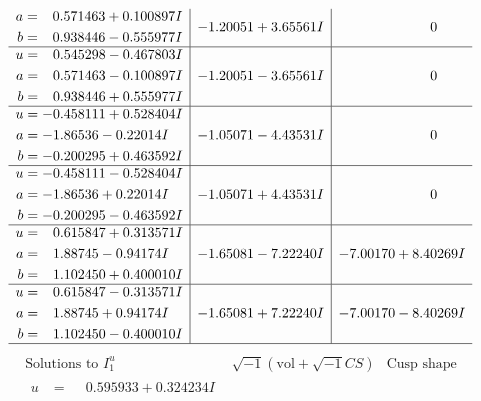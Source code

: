 \documentclass[1p]{elsarticle_modified}
\theoremstyle{definition}
\newcommand{\I}{\sqrt{-1}}
\begin{document}
$$\begin{array}{c|c|c}
\begin{aligned}
a &= \phantom{-}0.571463 + 0.100897 I \\
b &= \phantom{-}0.938446 - 0.555977 I\end{aligned}
 & -1.20051 + 3.65561 I & \phantom{-0.000000 } 0 \\ \hline\begin{aligned}
u &= \phantom{-}0.545298 - 0.467803 I \\
a &= \phantom{-}0.571463 - 0.100897 I \\
b &= \phantom{-}0.938446 + 0.555977 I\end{aligned}
 & -1.20051 - 3.65561 I & \phantom{-0.000000 } 0 \\ \hline\begin{aligned}
u &= -0.458111 + 0.528404 I \\
a &= -1.86536 - 0.22014 I \\
b &= -0.200295 + 0.463592 I\end{aligned}
 & -1.05071 - 4.43531 I & \phantom{-0.000000 } 0 \\ \hline\begin{aligned}
u &= -0.458111 - 0.528404 I \\
a &= -1.86536 + 0.22014 I \\
b &= -0.200295 - 0.463592 I\end{aligned}
 & -1.05071 + 4.43531 I & \phantom{-0.000000 } 0 \\ \hline\begin{aligned}
u &= \phantom{-}0.615847 + 0.313571 I \\
a &= \phantom{-}1.88745 - 0.94174 I \\
b &= \phantom{-}1.102450 + 0.400010 I\end{aligned}
 & -1.65081 - 7.22240 I & -7.00170 + 8.40269 I \\ \hline\begin{aligned}
u &= \phantom{-}0.615847 - 0.313571 I \\
a &= \phantom{-}1.88745 + 0.94174 I \\
b &= \phantom{-}1.102450 - 0.400010 I\end{aligned}
 & -1.65081 + 7.22240 I & -7.00170 - 8.40269 I\\
 \hline 
 \end{array}$$\newpage$$\begin{array}{c|c|c}  
\text{Solutions to }I^u_{1}& \I (\text{vol} + \sqrt{-1}CS) & \text{Cusp shape}\\
 \hline 
\begin{aligned}
u &= \phantom{-}0.595933 + 0.324234 I \\

\end{aligned}
\end{array}$$
\end{document}
